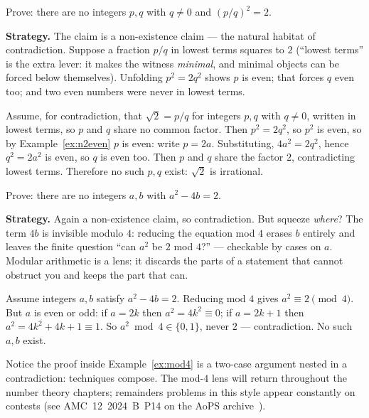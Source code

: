 \begin{example}\label{ex:sqrt2}
Prove: there are no integers $p, q$ with $q \ne 0$ and $(p/q)^2 = 2$.
\par\smallskip
\textbf{Strategy.} The claim is a non-existence claim --- the natural habitat of
contradiction. Suppose a fraction $p/q$ in lowest terms squares to $2$ (``lowest
terms'' is the extra lever: it makes the witness \emph{minimal}, and minimal
objects can be forced below themselves). Unfolding $p^2 = 2q^2$ shows $p$ is
even; that forces $q$ even too; and two even numbers were never in lowest terms.
\par\smallskip
\begin{solution}
Assume, for contradiction, that $\sqrt{2} = p/q$ for integers $p, q$ with
$q \ne 0$, written in lowest terms, so $p$ and $q$ share no common factor.
Then $p^2 = 2q^2$, so $p^2$ is even, so by Example~\ref{ex:n2even} $p$ is even:
write $p = 2a$. Substituting, $4a^2 = 2q^2$, hence $q^2 = 2a^2$ is even, so $q$
is even too. Then $p$ and $q$ share the factor $2$, contradicting lowest terms.
Therefore no such $p, q$ exist: $\sqrt{2}$ is irrational.
\end{solution}
\end{example}

\begin{example}\label{ex:mod4}
Prove: there are no integers $a, b$ with $a^2 - 4b = 2$.
\par\smallskip
\textbf{Strategy.} Again a non-existence claim, so contradiction. But squeeze
\emph{where}? The term $4b$ is invisible modulo $4$: reducing the equation mod
$4$ erases $b$ entirely and leaves the finite question ``can $a^2$ be $2$ mod
$4$?'' --- checkable by cases on $a$. Modular arithmetic is a lens: it discards
the parts of a statement that cannot obstruct you and keeps the part that can.
\par\smallskip
\begin{solution}
Assume integers $a,b$ satisfy $a^2 - 4b = 2$. Reducing mod $4$ gives
$a^2 \equiv 2 \pmod{4}$. But $a$ is even or odd: if $a = 2k$ then
$a^2 = 4k^2 \equiv 0$; if $a = 2k+1$ then $a^2 = 4k^2 + 4k + 1 \equiv 1$. So
$a^2 \bmod 4 \in \{0,1\}$, never $2$ --- contradiction. No such $a,b$ exist.
\end{solution}
\end{example}

Notice the proof inside Example~\ref{ex:mod4} is a two-case argument nested in
a contradiction: techniques compose. The mod-$4$ lens will return throughout the
number theory chapters; remainders problems in this style appear constantly on
contests (see AMC~12~2024~B~P14 on the AoPS archive~\cite{aops-amc}).

